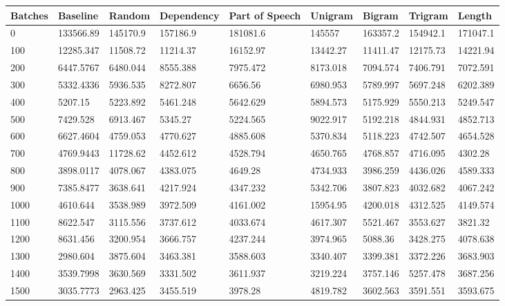 \documentclass [11pt, proquest] {uwthesis}[2020/12/20]
\begin{document}
\begin{table}[]
\centering
\begin{tiny}
\begin{tabular}{|l|l|l|l|l|l|l|l|l|}
\hline
Batches & Baseline & Random & Dependency & Part of Speech & Unigram & Bigram & Trigram & Length \\ \hline
0 & 133566.89 & 145170.9 & 157186.9 & 181081.6 & 145557 & 163357.2 & 154942.1 & 171047.1 \\  \hline
100 & 12285.347 & 11508.72 & 11214.37 & 16152.97 & 13442.27 & 11411.47 & 12175.73 & 14221.94 \\ \hline
200 & 6447.5767 & 6480.044 & 8555.388 & 7975.472 & 8173.018 & 7094.574 & 7406.791 & 7072.591 \\ \hline
300 & 5332.4336 & 5936.535 & 8272.807 & 6656.56 & 6980.953 & 5789.997 & 5697.248 & 6202.389 \\ \hline
400 & 5207.15 & 5223.892 & 5461.248 & 5642.629 & 5894.573 & 5175.929 & 5550.213 & 5249.547 \\ \hline
500 & 7429.528 & 6913.467 & 5345.27 & 5224.565 & 9022.917 & 5192.218 & 4844.931 & 4852.713 \\ \hline
600 & 6627.4604 & 4759.053 & 4770.627 & 4885.608 & 5370.834 & 5118.223 & 4742.507 & 4654.528 \\ \hline
700 & 4769.9443 & 11728.62 & 4452.612 & 4528.794 & 4650.765 & 4768.857 & 4716.095 & 4302.28 \\ \hline
800 & 3898.0117 & 4078.067 & 4383.075 & 4649.28 & 4734.933 & 3986.259 & 4436.026 & 4589.333 \\ \hline
900 & 7385.8477 & 3638.641 & 4217.924 & 4347.232 & 5342.706 & 3807.823 & 4032.682 & 4067.242 \\ \hline
1000 & 4610.644 & 3538.989 & 3972.509 & 4161.002 & 15954.95 & 4200.018 & 4312.525 & 4149.574 \\ \hline
1100 & 8622.547 & 3115.556 & 3737.612 & 4033.674 & 4617.307 & 5521.467 & 3553.627 & 3821.32 \\ \hline
1200 & 8631.456 & 3200.954 & 3666.757 & 4237.244 & 3974.965 & 5088.36 & 3428.275 & 4078.638 \\ \hline
1300 & 2980.604 & 3875.604 & 3463.381 & 3588.603 & 3340.407 & 3399.381 & 3372.226 & 3683.903 \\ \hline
1400 & 3539.7998 & 3630.569 & 3331.502 & 3611.937 & 3219.224 & 3757.146 & 5257.478 & 3687.256 \\ \hline
1500 & 3035.7773 & 2963.425 & 3455.519 & 3978.28 & 4819.782 & 3602.563 & 3591.551 & 3593.675 \\ \hline

\end{tabular}
\end{tiny}
\end{table}
\end{document}
